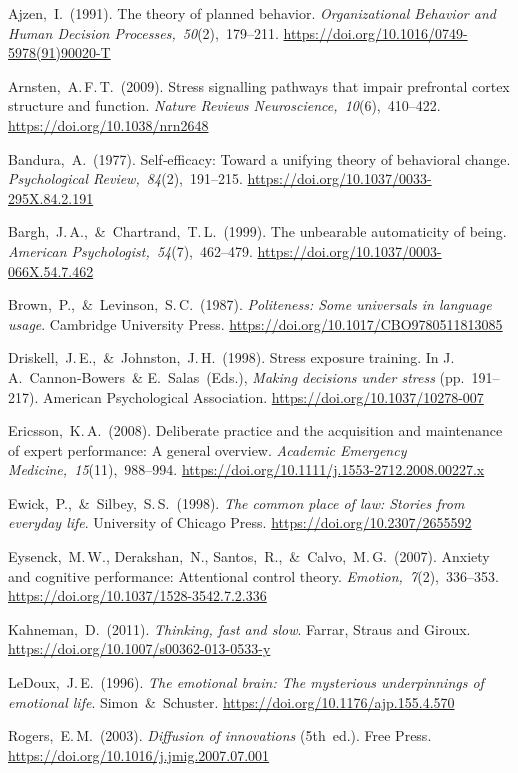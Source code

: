Ajzen, I. (1991). The theory of planned behavior. \emph{Organizational Behavior and Human Decision Processes, 50}(2), 179–211. \url{https://doi.org/10.1016/0749-5978(91)90020-T}

Arnsten, A.\,F.\,T. (2009). Stress signalling pathways that impair prefrontal cortex structure and function. \emph{Nature Reviews Neuroscience, 10}(6), 410–422. \url{https://doi.org/10.1038/nrn2648}

Bandura, A. (1977). Self‑efficacy: Toward a unifying theory of behavioral change. \emph{Psychological Review, 84}(2), 191–215. \url{https://doi.org/10.1037/0033-295X.84.2.191}

Bargh, J.\,A., \& Chartrand, T.\,L. (1999). The unbearable automaticity of being. \emph{American Psychologist, 54}(7), 462–479. \url{https://doi.org/10.1037/0003-066X.54.7.462}

Brown, P., \& Levinson, S.\,C. (1987). \emph{Politeness: Some universals in language usage}. Cambridge University Press. \url{https://doi.org/10.1017/CBO9780511813085}

Driskell, J.\,E., \& Johnston, J.\,H. (1998). Stress exposure training. In J.\,A. Cannon‑Bowers \& E. Salas (Eds.), \emph{Making decisions under stress} (pp. 191–217). American Psychological Association. \url{https://doi.org/10.1037/10278-007}

Ericsson, K.\,A. (2008). Deliberate practice and the acquisition and maintenance of expert performance: A general overview. \emph{Academic Emergency Medicine, 15}(11), 988–994. \url{https://doi.org/10.1111/j.1553-2712.2008.00227.x}

Ewick, P., \& Silbey, S.\,S. (1998). \emph{The common place of law: Stories from everyday life}. University of Chicago Press. \url{https://doi.org/10.2307/2655592}

Eysenck, M.\,W., Derakshan, N., Santos, R., \& Calvo, M.\,G. (2007). Anxiety and cognitive performance: Attentional control theory. \emph{Emotion, 7}(2), 336–353. \url{https://doi.org/10.1037/1528-3542.7.2.336}

Kahneman, D. (2011). \emph{Thinking, fast and slow}. Farrar, Straus and Giroux. \url{https://doi.org/10.1007/s00362-013-0533-y}

LeDoux, J.\,E. (1996). \emph{The emotional brain: The mysterious underpinnings of emotional life}. Simon \& Schuster. \url{https://doi.org/10.1176/ajp.155.4.570}

Rogers, E.\,M. (2003). \emph{Diffusion of innovations} (5th ed.). Free Press. \url{https://doi.org/10.1016/j.jmig.2007.07.001}

